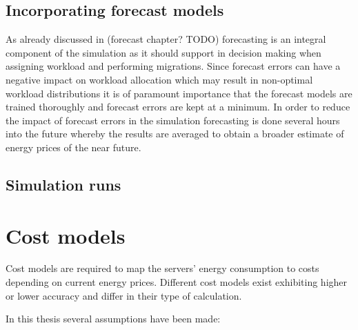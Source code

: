 \subsection{Incorporating forecast models}

As already discussed in (forecast chapter? TODO) forecasting is an integral component of the simulation as it should support in decision making when assigning workload and performing migrations. Since forecast errors can have a negative impact on workload allocation which may result in non-optimal workload distributions \cite{de2013study} it is of paramount importance that the forecast models are trained thoroughly and forecast errors are kept at a minimum. In order to reduce the impact of forecast errors in the simulation forecasting is done several hours into the future whereby the results are averaged to obtain a broader estimate of energy prices of the near future. 


\subsection{Simulation runs}



\section{Cost models}

Cost models are required to map the servers' energy consumption to costs depending on current energy prices. Different cost models exist exhibiting higher or lower accuracy and differ in their type of calculation. 

In this thesis several assumptions have been made: 

